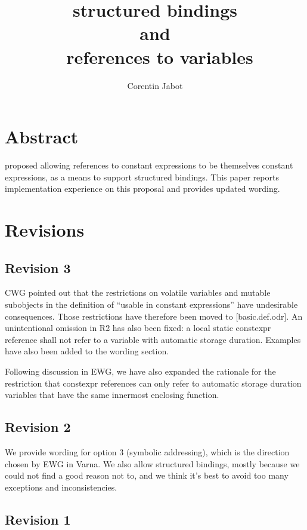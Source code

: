 \documentclass{wg21}
\title{\tcode{constexpr} structured bindings\\{\small and}\\\ references to \tcode{constexpr} variables}
\author{Corentin Jabot}{corentin.jabot@gmail.com}
\begin{document}
\maketitle

\section{Abstract}

 proposed allowing references to constant expressions to be themselves constant expressions,
as a means to support  structured bindings.
This paper reports implementation experience on this proposal and provides updated wording.


\section{Revisions}

\subsection{Revision 3}

CWG pointed out that the restrictions on volatile variables and mutable subobjects in the definition of ``usable in constant expressions'' have undesirable consequences. Those restrictions have therefore been moved to [basic.def.odr]. An unintentional omission in R2 has also been fixed: a local static constexpr reference shall not refer to a variable with automatic storage duration. Examples have also been added to the wording section.

Following discussion in EWG, we have also expanded the rationale for the restriction that constexpr references can only refer to automatic storage duration variables that have the same innermost enclosing function.

\subsection{Revision 2}

We provide wording for option 3 (symbolic addressing), which is the direction chosen by EWG in Varna.
We also allow  structured bindings, mostly because we could not find a good reason not to,
and we think it's best to avoid too many exceptions and inconsistencies.

\subsection{Revision 1}
\end{document}
